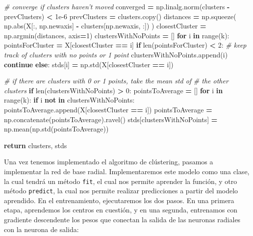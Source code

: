 \documentclass[
  a4paper,
,tablecaptionabove
]{scrartcl}
\newenvironment{Shaded}{\begin{snugshade}}{\end{snugshade}}
\newcommand{\BuiltInTok}[1]{#1}
\newcommand{\CommentTok}[1]{\textcolor[rgb]{0.56,0.35,0.01}{\textit{#1}}}
\newcommand{\ControlFlowTok}[1]{\textcolor[rgb]{0.13,0.29,0.53}{\textbf{#1}}}
\newcommand{\DecValTok}[1]{\textcolor[rgb]{0.00,0.00,0.81}{#1}}
\newcommand{\FloatTok}[1]{\textcolor[rgb]{0.00,0.00,0.81}{#1}}
\newcommand{\KeywordTok}[1]{\textcolor[rgb]{0.13,0.29,0.53}{\textbf{#1}}}
\newcommand{\NormalTok}[1]{#1}
\newcommand{\OperatorTok}[1]{\textcolor[rgb]{0.81,0.36,0.00}{\textbf{#1}}}
\begin{document}
\begin{Shaded}
\begin{Highlighting}[]
        \CommentTok{# converge if clusters haven't moved}
\NormalTok{        converged }\OperatorTok{=}\NormalTok{ np.linalg.norm(clusters }\OperatorTok{-}\NormalTok{ prevClusters) }\OperatorTok{<} \FloatTok{1e-6}
\NormalTok{        prevClusters }\OperatorTok{=}\NormalTok{ clusters.copy()}
\NormalTok{    distances }\OperatorTok{=}\NormalTok{ np.squeeze(}
\NormalTok{        np.}\BuiltInTok{abs}\NormalTok{(X[:, np.newaxis] }\OperatorTok{-}\NormalTok{ clusters[np.newaxis, :])}
\NormalTok{    )}
\NormalTok{    closestCluster }\OperatorTok{=}\NormalTok{ np.argmin(distances, axis}\OperatorTok{=}\DecValTok{1}\NormalTok{)}
\NormalTok{    clustersWithNoPoints }\OperatorTok{=}\NormalTok{ []}
    \ControlFlowTok{for}\NormalTok{ i }\KeywordTok{in} \BuiltInTok{range}\NormalTok{(k):}
\NormalTok{        pointsForCluster }\OperatorTok{=}\NormalTok{ X[closestCluster }\OperatorTok{==}\NormalTok{ i]}
        \ControlFlowTok{if} \BuiltInTok{len}\NormalTok{(pointsForCluster) }\OperatorTok{<} \DecValTok{2}\NormalTok{:}
            \CommentTok{# keep track of clusters with no points or 1 point}
\NormalTok{            clustersWithNoPoints.append(i)}
            \ControlFlowTok{continue}
        \ControlFlowTok{else}\NormalTok{:}
\NormalTok{            stds[i] }\OperatorTok{=}\NormalTok{ np.std(X[closestCluster }\OperatorTok{==}\NormalTok{ i])}

    \CommentTok{# if there are clusters with 0 or 1 points, take the mean std of}
    \CommentTok{# the other clusters}
    \ControlFlowTok{if} \BuiltInTok{len}\NormalTok{(clustersWithNoPoints) }\OperatorTok{>} \DecValTok{0}\NormalTok{:}
\NormalTok{        pointsToAverage }\OperatorTok{=}\NormalTok{ []}
        \ControlFlowTok{for}\NormalTok{ i }\KeywordTok{in} \BuiltInTok{range}\NormalTok{(k):}
            \ControlFlowTok{if}\NormalTok{ i }\KeywordTok{not} \KeywordTok{in}\NormalTok{ clustersWithNoPoints:}
\NormalTok{                pointsToAverage.append(X[closestCluster }\OperatorTok{==}\NormalTok{ i])}
\NormalTok{        pointsToAverage }\OperatorTok{=}\NormalTok{ np.concatenate(pointsToAverage).ravel()}
\NormalTok{        stds[clustersWithNoPoints] }\OperatorTok{=}\NormalTok{ np.mean(np.std(pointsToAverage))}

    \ControlFlowTok{return}\NormalTok{ clusters, stds}
\end{Highlighting}
\end{Shaded}

Una vez tenemos implementado el algoritmo de clústering, pasamos a
implementar la red de base radial. Implementaremos este modelo como una
clase, la cual tendrá un método \texttt{fit}, el cual nos permite
aprender la función, y otro método \texttt{predict}, la cual nos permite
realizar predicciones a partir del modelo aprendido. En el
entrenamiento, ejecutaremos los dos pasos. En una primera etapa,
aprendemos los centros en cuestión, y en una segunda, entrenamos con
gradiente descendente los pesos que conectan la salida de las neuronas
radiales con la neurona de salida:
\end{document}
